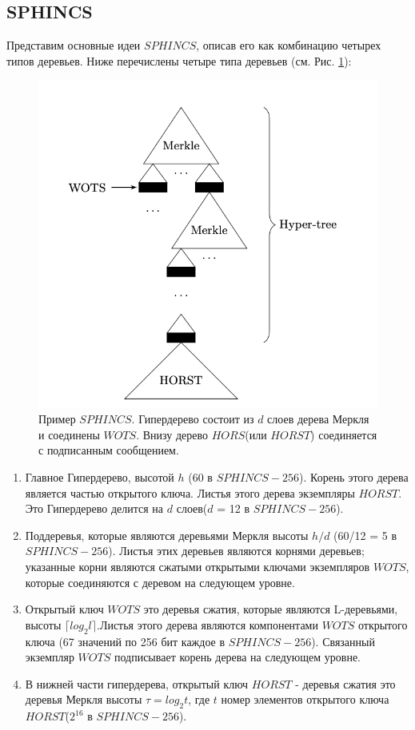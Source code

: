 \documentclass[a4paper, 14pt]{extarticle}
\begin{document}
\subsection{SPHINCS}
Представим основные идеи $SPHINCS$, описав его как комбинацию четырех типов деревьев. Ниже перечислены четыре типа деревьев (см. Рис. \ref{fig:SPHINCS}):

\begin{figure}[h]
    \centering
    \includegraphics[scale=0.85]{SPHINCS.png}
    \caption{Пример $SPHINCS$. Гипердерево состоит из $d$ слоев дерева Меркля и соединены $WOTS$. Внизу дерево $HORS$(или $HORST$) соединяется с подписанным сообщением.}
    \label{fig:SPHINCS}
\end{figure}

\begin{enumerate}
    \item Главное Гипердерево, высотой $h$ (60 в $SPHINCS-256$). Корень этого дерева является частью открытого ключа. Листья этого дерева экземпляры $HORST$. Это Гипердерево делится на $d$ слоев($d$ = 12 в $SPHINCS-256$).
    \item Поддеревья, которые являются деревьями Меркля высоты $h/d$ (60/12 = 5 в $SPHINCS-256$). Листья этих деревьев являются корнями деревьев; указанные корни являются сжатыми открытыми ключами экземпляров $WOTS$, которые соединяются с деревом на следующем уровне.
    \item Открытый ключ $WOTS$ это деревья сжатия, которые являются \newline L-деревьями, высоты $\lceil log_{2}l \rceil$.Листья этого дерева являются компонентами $WOTS$ открытого ключа (67 значений по 256 бит каждое в $SPHINCS-256$). Связанный экземпляр $WOTS$ подписывает корень дерева на следующем уровне.
    \item В нижней части гипердерева, открытый ключ $HORST$ - деревья сжатия это деревья Меркля высоты $\tau = log_{2}t$, где $t$ номер элементов открытого ключа $HORST$($2^{16}$ в $SPHINCS-256$).
\end{enumerate}
\end{document}
